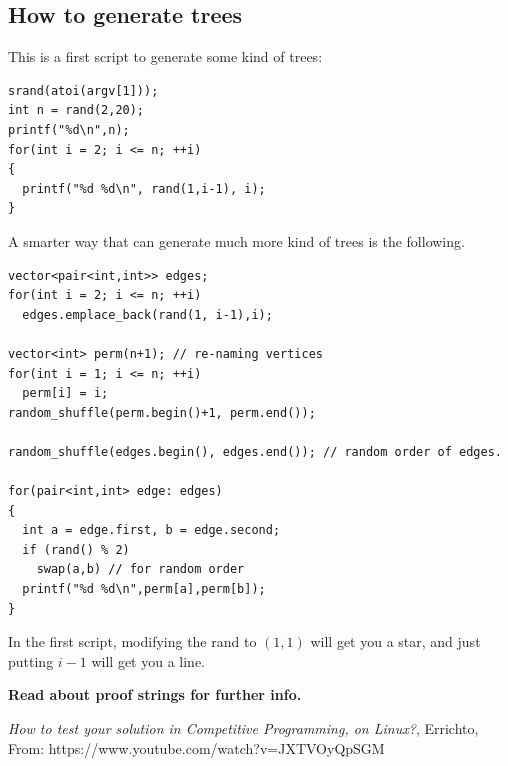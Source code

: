 \documentclass{IEEEtran}
\begin{document}
    \subsection{How to generate trees}
      This is a first script to generate some kind of trees:
      \begin{lstlisting}
srand(atoi(argv[1]));
int n = rand(2,20);
printf("%d\n",n);
for(int i = 2; i <= n; ++i)
{
  printf("%d %d\n", rand(1,i-1), i);
}
      \end{lstlisting}
      \par A smarter way that can generate much more kind of trees is the following. 
      \begin{lstlisting}
vector<pair<int,int>> edges;
for(int i = 2; i <= n; ++i)
  edges.emplace_back(rand(1, i-1),i);
        
vector<int> perm(n+1); // re-naming vertices
for(int i = 1; i <= n; ++i)
  perm[i] = i;
random_shuffle(perm.begin()+1, perm.end());

random_shuffle(edges.begin(), edges.end()); // random order of edges.

for(pair<int,int> edge: edges)
{
  int a = edge.first, b = edge.second;
  if (rand() % 2)
    swap(a,b) // for random order
  printf("%d %d\n",perm[a],perm[b]);
}
      \end{lstlisting}
      \par In the first script, modifying the rand to $(1,1)$ will get you a star, and just putting $i-1$ will get you a line.\par 
      \textbf{Read about proof strings for further info.}
  \begin{thebibliography}{}
    \textit{How to test your solution in Competitive Programming, on Linux?},
    Errichto,
    From: https://www.youtube.com/watch?v=JXTVOyQpSGM
  \end{thebibliography}
\end{document}
